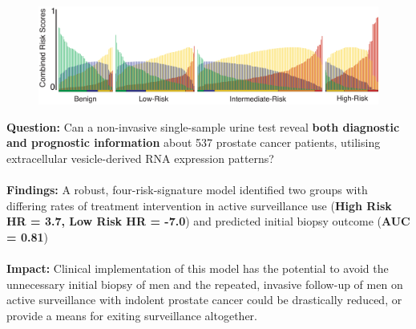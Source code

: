 \documentclass[article,30pt,extrafontsizes]{memoir}
\begin{document}
\begin{flushleft}
\begin{mdframed}[style=brentsmdfstyle]
  \endgroup
\end{mdframed}

\graphicspath{ {Figures/} }
\begin{figure}
  \centering
  \includegraphics[width=80cm]{RiskProfiles}
\end{figure}
\begin{adjmulticols*}{2}{10mm}{10mm}
\normalsize{
\color{bodytextcol}
\begin{mdframed}[backgroundcolor = myframecolour,
                  font = \fontfamily{ppl}\selectfont,
                  fontcolor = white, 
                  roundcorner = 20pt, 
                  innerleftmargin = 30pt,
                  innerrightmargin = 30pt,
                  frametitle={\textbf{Quick Read:}}]
\large
\textbf{Question:} Can a non-invasive single-sample urine test reveal \textbf{both diagnostic and prognostic information} about 537 prostate cancer patients, utilising extracellular vesicle-derived RNA expression patterns? \\\\
\textbf{Findings:} A robust, four-risk-signature model identified two groups with differing rates of treatment intervention in active surveillance use (\textbf{High Risk HR = 3.7, Low Risk HR = -7.0}) and predicted initial biopsy outcome (\textbf{AUC = 0.81})\\\\
\textbf{Impact:} Clinical implementation of this model has the potential to avoid the unnecessary initial biopsy of men and the repeated, invasive follow-up of men on active surveillance with indolent prostate cancer could be drastically reduced, or provide a means for exiting surveillance altogether.\\
\end{mdframed}
\vspace{-40mm}

}
\end{adjmulticols*}
\end{flushleft}
\end{document}
